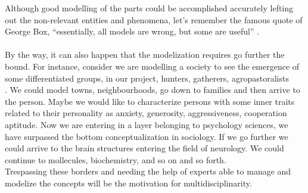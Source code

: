 \documentclass[11pt,oneside,a4paper,openright]{report}
\begin{document}
% 
%

Although good modelling of the parts could be accomplished accurately lefting out the non-relevant entities and phenomena, let's remember the famous quote of George Box, ``essentially, all models are wrong, but some are useful'' \cite[p.2]{Box1979}.
\\ \\


By the way, it can also happen that the modelization requires go further the bound. For instance, consider we are modelling a society to see the emergence of some differentiated groups, in our project, hunters, gatherers, agropastoralists \\ . We could model towns, neighbourhoods, go down to families and then arrive to the person. Maybe we would like to characterize persons with some inner traits related to their personality as anxiety, generosity, aggressiveness, cooperation aptitude. Now we are entering in a layer belonging to psychology sciences, we have surpassed the bottom conceptualization in sociology. If we go further we could arrive to the brain structures entering the field of neurology. We could continue to mollecules, biochemistry, and so on and so forth\cite[p.56]{MWilliams1999}.\\
Trespassing these borders and needing the help of experts able to manage and modelize the concepts will be the motivation for multidisciplinarity. 

\end{document}
